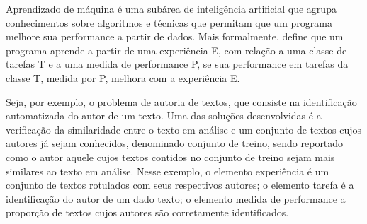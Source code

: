 Aprendizado de máquina é uma subárea de inteligência artificial que agrupa conhecimentos sobre algoritmos e técnicas que permitam que um programa melhore sua performance a partir de dados. Mais formalmente, \cite{Tom_mitchell} define que um programa aprende a partir de uma experiência E, com relação a uma classe de tarefas T e a uma medida de performance P, se sua performance em tarefas da classe T, medida por P, melhora com a experiência E.

Seja, por exemplo, o problema de autoria de textos, que consiste na identificação automatizada do autor de um texto. Uma das soluções desenvolvidas é a verificação da similaridade entre o texto em análise e um conjunto de textos cujos autores já sejam conhecidos, denominado conjunto de treino, sendo reportado como o autor aquele cujos textos contidos no conjunto de treino sejam mais similares ao texto em análise. Nesse exemplo, o elemento experiência é um conjunto de textos rotulados com seus respectivos autores; o elemento tarefa é a identificação do autor de um dado texto; o elemento medida de performance a proporção de textos cujos autores são corretamente identificados.




\cite{ML_debt} \cite{ML_know}

